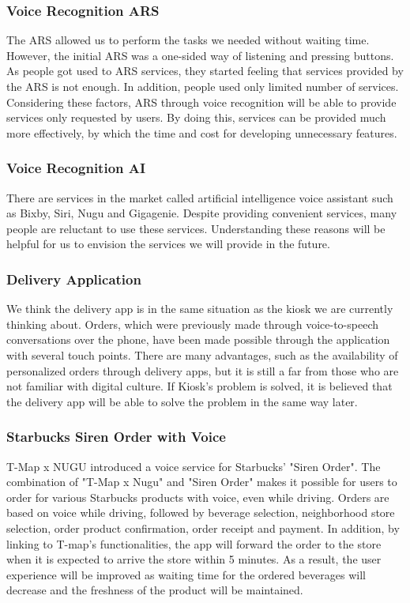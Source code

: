 \documentclass[conference,compsoc]{IEEEtran}
\begin{document}
\subsubsection{Voice Recognition ARS}
The ARS allowed us to perform the tasks we needed without waiting time. However, the initial ARS was a one-sided way of listening and pressing buttons. As people got used to ARS services, they started feeling that services provided by the ARS is not enough. In addition, people used only limited number of services. Considering these factors, ARS through voice recognition will be able to provide services only requested by users. By doing this, services can be provided much more effectively, by which the time and cost for developing unnecessary features.

\subsubsection{Voice Recognition AI}
There are services in the market called artificial intelligence voice assistant such as Bixby, Siri, Nugu and Gigagenie. Despite providing convenient services, many people are reluctant to use these services. Understanding these reasons will be helpful for us to envision the services we will provide in the future.

\subsubsection{Delivery Application}
We think the delivery app is in the same situation as the kiosk we are currently thinking about. Orders, which were previously made through voice-to-speech conversations over the phone, have been made possible through the application with several touch points. There are many advantages, such as the availability of personalized orders through delivery apps, but it is still a far from those who are not familiar with digital culture. If Kiosk's problem is solved, it is believed that the delivery app will be able to solve the problem in the same way later.

\subsubsection{Starbucks Siren Order with Voice}
T-Map x NUGU introduced a voice service for Starbucks' "Siren Order". The combination of "T-Map x Nugu" and "Siren Order" makes it possible for users to order for various Starbucks products with voice, even while driving. Orders are based on voice while driving, followed by beverage selection, neighborhood store selection, order product confirmation, order receipt and payment. In addition, by linking to T-map's functionalities, the app will forward the order to the store when it is expected to arrive the store within 5 minutes. As a result, the user experience will be improved as waiting time for the ordered beverages will decrease and the freshness of the product will be maintained.
\end{document}
